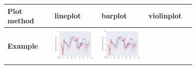\begin{refsection}
\begin{subappendices}
		\begin{tabular}[c]{l|p{0.25\linewidth}|p{0.25\linewidth}|p{0.25\linewidth}|}
			\toprule
			\textbf{Plot method} & lineplot & barplot & violinplot \\
			\hline
			\textbf{Example} & 
				\includegraphics[width=\linewidth, page=1]{psyplot-figures/psy-simple-demo.pdf} &
				\includegraphics[width=\linewidth, page=2]{psyplot-figures/psy-simple-demo.pdf} &

\end{tabular}
\end{subappendices}
\end{refsection}
